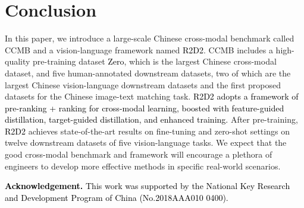 \documentclass[sigconf]{acmart}
\def\mmcr{\textcolor{black}}
\begin{document}
\section{Conclusion}
\label{conclusion}
In this paper, we introduce a large-scale Chinese cross-modal benchmark called CCMB and a vision-language framework named \mmcr{R2D2}. CCMB includes a high-quality pre-training dataset \mmcr{Zero}, which is the largest Chinese cross-modal dataset, and five human-annotated downstream datasets, two of which are the largest Chinese vision-language downstream datasets and the first proposed datasets for the Chinese image-text matching task. \mmcr{R2D2 adopts a framework of pre-ranking + ranking for cross-modal learning, boosted with feature-guided distillation, target-guided distillation, and enhanced training.} 
After pre-training, \mmcr{R2D2} achieves state-of-the-art results on fine-tuning and zero-shot settings on twelve downstream datasets of five vision-language tasks.
We expect that the good cross-modal benchmark and framework will encourage a plethora of engineers to develop more effective methods in specific real-world scenarios.  

\mmcr{\textbf{Acknowledgement.} This work was supported by the National Key Research and Development Program of China (No.2018AAA010 0400).}
\end{document}
